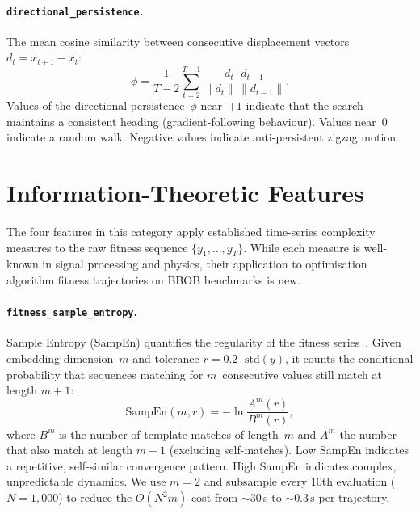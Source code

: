 \paragraph{\texttt{directional\_persistence}.}
The mean cosine similarity between consecutive displacement vectors
$d_t = x_{t+1} - x_t$:
\begin{equation}
\label{eq:dir_persist}
  \phi = \frac{1}{T-2}\sum_{t=2}^{T-1}
    \frac{d_t \cdot d_{t-1}}
         {\lVert d_t \rVert \, \lVert d_{t-1} \rVert}.
\end{equation}
Values of the directional persistence~$\phi$ near~$+1$ indicate that the
search maintains a consistent heading
(gradient-following behaviour). Values near~$0$ indicate a random walk.
Negative values indicate anti-persistent zigzag motion.

\section{Information-Theoretic Features}
\label{sec:features:infotheo}

The four features in this category apply established time-series complexity
measures to the raw fitness sequence $\{y_1, \ldots, y_T\}$.  While each
measure is well-known in signal processing and physics, their application to
optimisation algorithm fitness trajectories on BBOB benchmarks is new.

\paragraph{\texttt{fitness\_sample\_entropy}.}
Sample Entropy (SampEn) quantifies the regularity of the fitness
series~\cite{richman2000sampen}.  Given embedding dimension~$m$ and tolerance
$r = 0.2 \cdot \mathrm{std}(y)$, it counts the conditional probability that
sequences matching for $m$~consecutive values still match at length $m+1$:
\begin{equation}
\label{eq:sampen}
  \mathrm{SampEn}(m, r)
    = -\ln \frac{A^m(r)}{B^m(r)},
\end{equation}
where $B^m$ is the number of template matches of length~$m$ and $A^m$ the
number that also match at length $m+1$ (excluding self-matches).  Low SampEn
indicates a repetitive, self-similar convergence pattern. High SampEn indicates
complex, unpredictable dynamics.  We use $m = 2$ and subsample every 10th
evaluation ($N = 1{,}000$) to reduce the $O(N^2 m)$ cost from ${\sim}30$\,s to
${\sim}0.3$\,s per trajectory.

